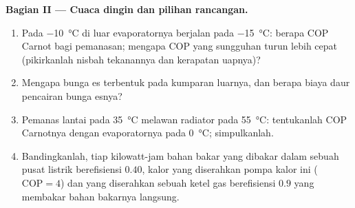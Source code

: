 \begin{problem}
\textbf{Bagian II --- Cuaca dingin dan pilihan rancangan.}
\begin{enumerate}[resume]
  \item Pada \qty{-10}{\celsius} di luar evaporatornya berjalan pada
        \qty{-15}{\celsius}: berapa COP Carnot bagi pemanasan; mengapa COP
        yang sungguhan turun lebih cepat (pikirkanlah nisbah tekanannya dan
        kerapatan uapnya)?
  \item Mengapa bunga es terbentuk pada kumparan luarnya, dan berapa biaya
        daur pencairan bunga esnya?
  \item Pemanas lantai pada \qty{35}{\celsius} melawan radiator pada
        \qty{55}{\celsius}: tentukanlah COP Carnotnya dengan evaporatornya pada
        \qty{0}{\celsius}; simpulkanlah.
  \item Bandingkanlah, tiap kilowatt-jam bahan bakar yang dibakar dalam sebuah pusat listrik
        berefisiensi $0.40$, kalor yang diserahkan pompa kalor ini ($\mathrm{COP}
        = 4$) dan yang diserahkan sebuah ketel gas berefisiensi $0.9$ yang membakar bahan bakarnya
        langsung.
\end{enumerate}


\end{problem}
